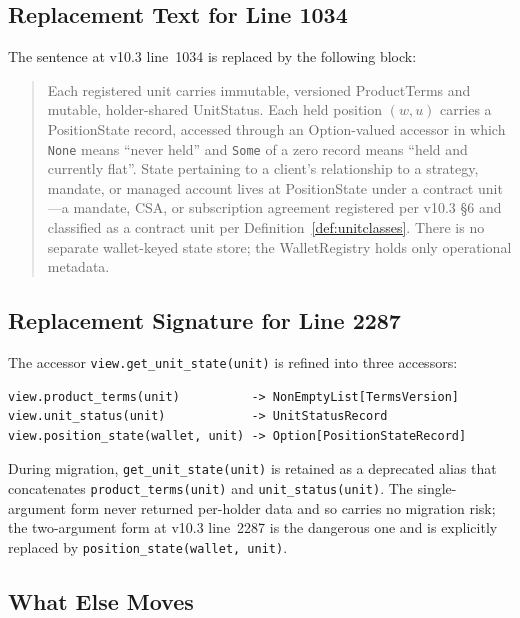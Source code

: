 \documentclass[11pt,a4paper]{article}
\begin{document}
\subsection{Replacement Text for Line 1034}

The sentence at v10.3 line~1034 is replaced by the following block:

\begin{quote}
Each registered unit carries immutable, versioned ProductTerms and mutable, holder-shared UnitStatus. Each held position $(w, u)$ carries a PositionState record, accessed through an Option-valued accessor in which \texttt{None} means ``never held'' and \texttt{Some} of a zero record means ``held and currently flat''. State pertaining to a client's relationship to a strategy, mandate, or managed account lives at PositionState under a contract unit---a mandate, CSA, or subscription agreement registered per v10.3 \S 6 and classified as a contract unit per Definition~\ref{def:unitclasses}. There is no separate wallet-keyed state store; the WalletRegistry holds only operational metadata.
\end{quote}

\subsection{Replacement Signature for Line 2287}

The accessor \texttt{view.get\_unit\_state(unit)} is refined into three accessors:

\begin{lstlisting}
view.product_terms(unit)          -> NonEmptyList[TermsVersion]
view.unit_status(unit)            -> UnitStatusRecord
view.position_state(wallet, unit) -> Option[PositionStateRecord]
\end{lstlisting}

\noindent During migration, \texttt{get\_unit\_state(unit)} is retained as a deprecated alias that concatenates \texttt{product\_terms(unit)} and \texttt{unit\_status(unit)}. The single-argument form never returned per-holder data and so carries no migration risk; the two-argument form at v10.3 line~2287 is the dangerous one and is explicitly replaced by \texttt{position\_state(wallet, unit)}.

\subsection{What Else Moves}
\end{document}
